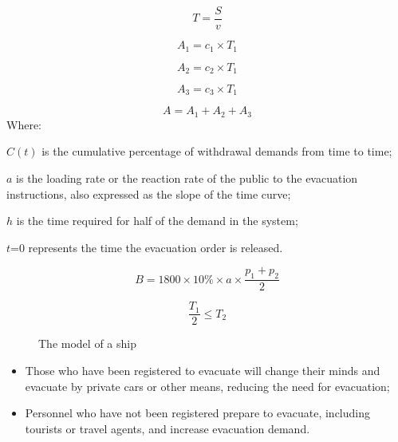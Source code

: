 \documentclass{mcmthesis}
\begin{document}
\begin{equation}\label{5}
T=\frac{S}{v}
\end{equation}

\begin{equation}\label{5}
A_1=c_1 \times T_1
\end{equation}

\begin{equation}\label{6}
A_2=c_2  \times T_1
\end{equation}

\begin{equation}\label{7}
A_3=c_3  \times T_1
\end{equation}

\begin{equation}\label{8}
A=A_1+A_2+A_3
\end{equation}
Where:

$C(t)$ is the cumulative percentage of withdrawal demands from time to time;

$a$ is the loading rate or the reaction rate of the public to the evacuation instructions, also expressed as the slope of the time curve;

$h$ is the time required for half of the demand in the system;

$t$=0 represents the time the evacuation order is released.



\begin{equation}\label{9}
B=1800 \times 10\% \times a \times \frac{p_1+p_2}{2}
\end{equation}


\begin{equation}\label{10}
\frac{T_1}{2}\leq T_2
\end{equation}

\begin{figure}[tbp]
  \caption{The model of a ship}\label{figure1}
\end{figure}
 

\begin{itemize}

\item Those who have been registered to evacuate will change their minds and evacuate by private cars or other means, reducing the need for evacuation;
\item Personnel who have not been registered prepare to evacuate, including tourists or travel agents, and increase evacuation demand.

\end{itemize}
\end{document}

